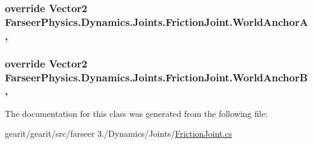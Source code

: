 \hypertarget{class_farseer_physics_1_1_dynamics_1_1_joints_1_1_friction_joint_acf3ccdea9c9bb259d1131b721920b178}{
\subsubsection[{World\+Anchor\+A}]{\setlength{\rightskip}{0pt plus 5cm}override Vector2 Farseer\+Physics.\+Dynamics.\+Joints.\+Friction\+Joint.\+World\+Anchor\+A\hspace{0.3cm}{\ttfamily [get]}, {\ttfamily [set]}}}\label{class_farseer_physics_1_1_dynamics_1_1_joints_1_1_friction_joint_acf3ccdea9c9bb259d1131b721920b178}
\hypertarget{class_farseer_physics_1_1_dynamics_1_1_joints_1_1_friction_joint_aa184754ddee2655a1b16f4ac30715b27}{
\subsubsection[{World\+Anchor\+B}]{\setlength{\rightskip}{0pt plus 5cm}override Vector2 Farseer\+Physics.\+Dynamics.\+Joints.\+Friction\+Joint.\+World\+Anchor\+B\hspace{0.3cm}{\ttfamily [get]}, {\ttfamily [set]}}}\label{class_farseer_physics_1_1_dynamics_1_1_joints_1_1_friction_joint_aa184754ddee2655a1b16f4ac30715b27}


The documentation for this class was generated from the following file\+:\begin{DoxyCompactItemize}
\item 
gearit/gearit/src/farseer 3./\+Dynamics/\+Joints/\hyperlink{_friction_joint_8cs}{Friction\+Joint.\+cs}\end{DoxyCompactItemize}
